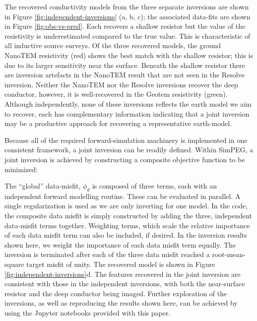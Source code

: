 \documentclass[paper]{geophysics}
\begin{document}
The recovered conductivity  models from the three separate inversions are shown in Figure \ref{fig:independent-inversions} (a, b, c); the associated data-fits are shown in Figure \ref{fig:obs-vs-pred}. Each recovers a shallow resistor but the value of the resistivity is underestimated compared to the true value. This is characteristic of all inductive source surveys. Of the three recovered models, the ground NanoTEM resistivity (red) shows the best match with the shallow resistor; this is due to its larger sensitivity  near the surface. Beneath the shallow resistor there are inversion artefacts in the NanoTEM result that are not seen in the Resolve inversion. Neither the NanoTEM nor the  Resolve inversions recover the deep conductor, however, it is well-recovered in the Geotem resistivity (green).  Although independently, none of these inversions reflects the earth model we aim to recover, each has complementary information indicating that a joint inversion may be a productive approach for recovering a representative earth-model.





Because all of the required forward-simulation machinery is implemented in one consistent framework, a joint inversion can be readily defined. Within SimPEG, a joint inversion is achieved by constructing a composite objective function to be minimized:


The ``global'' data-misfit, $\phi_d$ is composed of three terms, each with an independent forward modelling routine. These can be evaluated in parallel. A single regularization is used as we are only inverting for one model. In the code, the composite data misfit is simply constructed by adding the three, independent data-misfit terms together. Weighting terms, which scale the relative importance of each data misfit term can also be included, if desired. In the inversion results shown here, we weight the importance of each data misfit term equally. The inversion is terminated after each of the three data misfit reached a root-mean-square target misfit of unity.  The recovered model is shown in Figure \ref{fig:independent-inversions}d. The features recovered in the joint inversion are consistent with those in the independent inversions, with both the near-surface resistor and the deep conductor being imaged. Further exploration of the inversions, as well as reproducing the results shown here, can be achieved by using the Jupyter notebooks provided with this paper.
\end{document}
